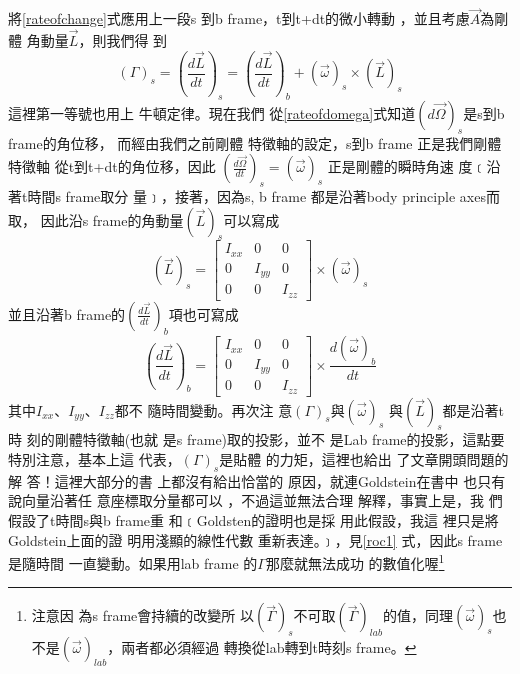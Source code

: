 \documentclass[12pt,twoside]{article}
\begin{document}
將\ref{rateofchange}式應用上一段s%
到b frame，t到t+dt的微小轉動%
，並且考慮$\vec{A}$為剛體%
角動量$\vec{L}$，則我們得%
到%
\begin{equation}
\left( \Gamma \right) _{s}=\left( \frac{d\vec{L}}{dt}\right) _{s}=\left( 
\frac{d\vec{L}}{dt}\right) _{b}+\left( \vec{\omega}\right) _{s}\times \left( 
\vec{L}\right) _{s}  \label{liw}
\end{equation}%
這裡第一等號也用上%
牛頓定律。現在我們%
從\ref{rateofdomega}式知道$\left( d\vec{\Omega}%
\right) _{s}$是s到b frame的角位移，%
而經由我們之前剛體%
特徵軸的設定，s到b frame%
正是我們剛體特徵軸%
從t到t+dt的角位移，因此%
$\left( \frac{d\vec{\Omega}}{dt}\right) _{s}=\left( \vec{\omega}\right) _{s}$%
正是剛體的瞬時角速%
度﹝沿著t時間s frame取分%
量﹞，接著，因為s, b frame%
都是沿著body principle axes而取，%
因此沿s frame的角動量$\left( \vec{L%
}\right) _{s}$可以寫成%
\begin{equation*}
\left( \vec{L}\right) _{s}=\left[ 
\begin{array}{ccc}
I_{xx} & 0 & 0 \\ 
0 & I_{yy} & 0 \\ 
0 & 0 & I_{zz}%
\end{array}%
\right] \times \left( \vec{\omega}\right) _{s}
\end{equation*}%
並且沿著b frame的$\left( \frac{d\vec{L}}{dt}%
\right) _{b}$項也可寫成%
\begin{equation*}
\left( \frac{d\vec{L}}{dt}\right) _{b}=\left[ 
\begin{array}{ccc}
I_{xx} & 0 & 0 \\ 
0 & I_{yy} & 0 \\ 
0 & 0 & I_{zz}%
\end{array}%
\right] \times \frac{d\left( \vec{\omega}\right) _{b}}{dt}
\end{equation*}%
其中$I_{xx}$、$I_{yy}$、$I_{zz}$都不%
隨時間變動。再次注%
意$\left( \Gamma \right) _{s}$與$\left( \vec{\omega}\right) _{s}$%
與$\left( \vec{L}\right) _{s}$都是沿著t時%
刻的剛體特徵軸(也就%
是s frame)取的投影，並不%
是Lab frame的投影，這點要%
特別注意，基本上這%
代表，$\left( \Gamma \right) _{s}$是貼體%
的力矩，這裡也給出%
了文章開頭問題的解%
答！這裡大部分的書%
上都沒有給出恰當的%
原因，就連Goldstein在書中%
也只有說向量沿著任%
意座標取分量都可以%
，不過這並無法合理%
解釋，事實上是，我%
們假設了t時間s與b frame重%
和﹝Goldsten的證明也是採%
用此假設\cite{goldstein}，我這%
裡只是將Goldstein上面的證%
明用淺顯的線性代數%
重新表達。﹞，見\ref{roc1}%
式，因此s frame是隨時間%
一直變動。如果用lab frame%
的$\Gamma $那麼就無法成功%
的數值化喔\footnote{注意因%
為s frame會持續的改變所%
以$\left( \vec{\Gamma}\right) _{s}$不可取$\left( 
\vec{\Gamma}\right) _{lab}$的值，同理$\left( 
\vec{\omega}\right) _{s}$也不是$\left( \vec{\omega}\right)
_{lab}$，兩者都必須經過%
轉換從lab轉到t時刻s frame。}%
\end{document}

